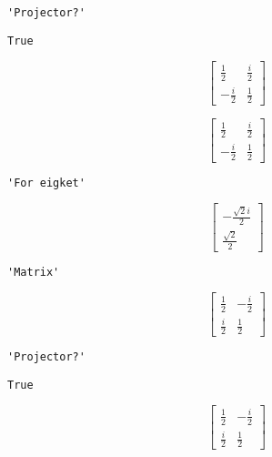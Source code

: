 \documentclass[11pt]{article}
\begin{document}
    
    
    \begin{verbatim}
'Projector?'
    \end{verbatim}

    
    
    \begin{verbatim}
True
    \end{verbatim}

    
    $$\left[\begin{matrix}\frac{1}{2} & \frac{i}{2}\\- \frac{i}{2} & \frac{1}{2}\end{matrix}\right]$$

    
    $$\left[\begin{matrix}\frac{1}{2} & \frac{i}{2}\\- \frac{i}{2} & \frac{1}{2}\end{matrix}\right]$$

    
    
    \begin{verbatim}
'For eigket'
    \end{verbatim}

    
    $$\left[\begin{matrix}- \frac{\sqrt{2} i}{2}\\\frac{\sqrt{2}}{2}\end{matrix}\right]$$

    
    
    \begin{verbatim}
'Matrix'
    \end{verbatim}

    
    $$\left[\begin{matrix}\frac{1}{2} & - \frac{i}{2}\\\frac{i}{2} & \frac{1}{2}\end{matrix}\right]$$

    
    
    \begin{verbatim}
'Projector?'
    \end{verbatim}

    
    
    \begin{verbatim}
True
    \end{verbatim}

    
    $$\left[\begin{matrix}\frac{1}{2} & - \frac{i}{2}\\\frac{i}{2} & \frac{1}{2}\end{matrix}\right]$$
\end{document}

